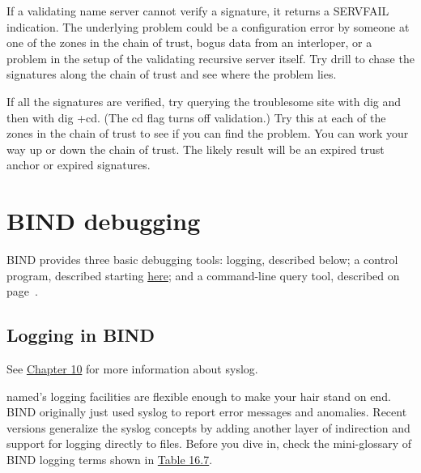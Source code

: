 
If a validating name server cannot verify a signature, it returns a
\protect\hypertarget{part0024_split_068.htmlux5cux23_idIndexMarker2279}{}{}SERVFAIL
indication. The underlying problem could be a configuration error by
someone at one of the zones in the chain of trust, bogus data from an
interloper, or a problem in the setup of the validating recursive server
itself. Try {drill} to chase the signatures along the chain of trust and
see where the problem lies.

If all the signatures are verified, try querying the troublesome site
with {dig} and then with {dig +cd}. (The {cd} flag turns off
validation.) Try this at each of the zones in the chain of trust to see
if you can find the problem. You can work your way up or down the chain
of trust. The likely result will be an expired trust anchor or expired
signatures.


\section{BIND debugging}


\protect\hypertarget{part0024_split_069.htmlux5cux23_idIndexMarker2280}{}{}\protect\hypertarget{part0024_split_069.htmlux5cux23_idIndexMarker2281}{}{}\protect\hypertarget{part0024_split_069.htmlux5cux23_idIndexMarker2282}{}{}BIND
provides three basic debugging tools: logging, described below; a
control program, described starting
\protect\hyperlink{part0024_split_071.htmlux5cux23_idTextAnchor964}{here};
and a command-line query tool, described on page~\pageref{sec:lame-delegations}.

\protect\hypertarget{part0024_split_070.html}{}{}

\hypertarget{part0024_split_070.htmlux5cux23_idContainer1069}{}
\hypertarget{part0024_split_070.htmlux5cux23calibre_pb_69}{%
\subsection[Logging in
BIND]{\texorpdfstring{\protect\hypertarget{part0024_split_070.htmlux5cux23_idTextAnchor955}{}{}Logging
in
BIND}{Logging in BIND}}\label{part0024_split_070.htmlux5cux23calibre_pb_69}}

\leavevmode\hypertarget{part0024_split_070.htmlux5cux23_idContainer1053}{}%
See
\protect\hyperlink{part0017_split_000.htmlux5cux23_idTextAnchor493}{Chapter
10} for more information about syslog.

{\protect\hypertarget{part0024_split_070.htmlux5cux23_idIndexMarker2283}{}{}}{named}'s
logging facilities are flexible enough to make your hair stand on end.
BIND
\protect\hypertarget{part0024_split_070.htmlux5cux23_idIndexMarker2284}{}{}originally
just used syslog to report error messages and anomalies. Recent versions
generalize the syslog concepts by adding another layer of indirection
and support for logging directly to files. Before you dive in, check the
mini-glossary of BIND logging terms shown in
\protect\hyperlink{part0024_split_070.htmlux5cux23_idTextAnchor956}{Table
16.7}.

